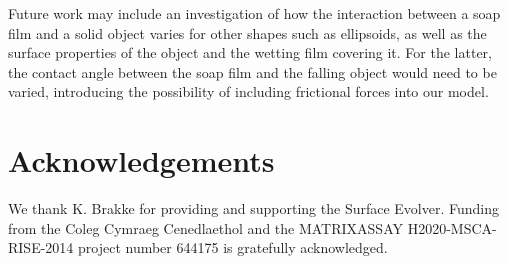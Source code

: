 \documentclass[preprint]{revtex4-1}
\begin{document}
Future work may include an investigation of how the interaction between a soap film and a solid object varies for other shapes such as ellipsoids, as well as the surface properties of the object and the wetting film covering it. For the latter, the contact angle between the soap film and the falling object would need to be varied, introducing the possibility of including frictional forces into our model.
 
\section*{Acknowledgements}

We thank K. Brakke for providing and supporting the Surface Evolver. Funding from the Coleg Cymraeg Cenedlaethol and the MATRIXASSAY H2020-MSCA-RISE-2014 project number 644175 is gratefully acknowledged.

%
\end{document}
